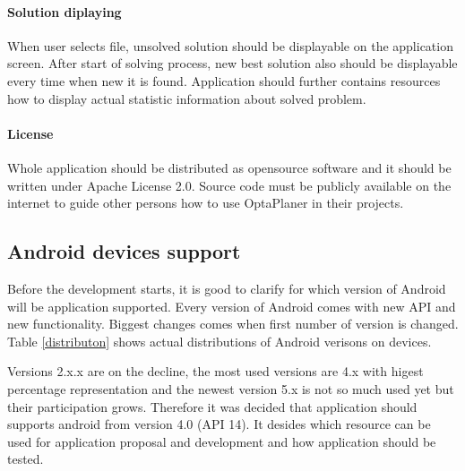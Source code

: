 \paragraph{Solution diplaying}
When user selects file, unsolved solution should be displayable on the application screen. After start of solving
process, new best solution also should be displayable every time when new it is found. Application should further
contains resources how to display actual statistic information about solved problem.

\paragraph{License}
Whole application should be distributed as opensource software and it should be written under Apache License 2.0.
Source code must be publicly available on the internet to guide other persons how to use OptaPlaner in their projects.

\subsection{Android devices support}
Before the development starts, it is good to clarify for which version of Android will be application supported. Every
version of Android comes with new API and new functionality. Biggest changes comes when first number of version is
changed. Table \ref{distributon} shows actual distributions of Android verisons on devices.

Versions 2.x.x are on the decline, the most used versions are 4.x with higest percentage representation and the newest
version 5.x is not so much used yet but their participation grows. Therefore it was decided that application should
supports android from version 4.0 (API 14). It desides which resource can be used for application proposal and
development and how application should be tested.

